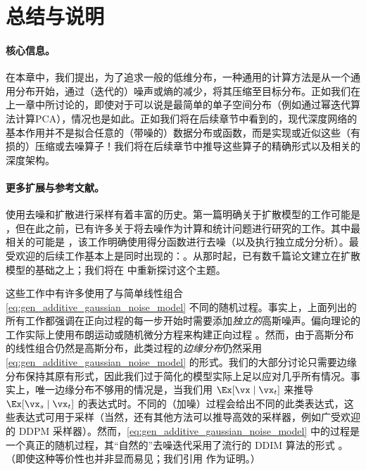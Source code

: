 \documentclass[../../book-main_zh.tex]{subfiles}
\begin{document}

\section{总结与说明}
\paragraph{核心信息。}
在本章中，我们提出，为了追求一般的低维分布，一种通用的计算方法是从一个通用分布开始，通过（迭代的）噪声或熵的减少，将其压缩至目标分布。正如我们在上一章中所讨论的，即使对于可以说是最简单的单子空间分布（例如通过幂迭代算法计算PCA），情况也是如此。正如我们将在后续章节中看到的，现代深度网络的基本作用并不是拟合任意的（带噪的）数据分布或函数，而是实现或近似这些（有损的）压缩或去噪算子！我们将在后续章节中推导这些算子的精确形式以及相关的深度架构。

\paragraph{更多扩展与参考文献。}
使用去噪和扩散进行采样有着丰富的历史。第一篇明确关于扩散模型的工作可能是 \cite{Sohl-Dickstein2015}，但在此之前，已有许多关于将去噪作为计算和统计问题进行研究的工作。其中最相关的可能是 \cite{hyvarinen05a}，该工作明确使用得分函数进行去噪（以及执行独立成分分析）。最受欢迎的后续工作基本上是同时出现的：\cite{ho2020denoising,song2019}。从那时起，已有数千篇论文建立在扩散模型的基础之上；我们将在  中重新探讨这个主题。

这些工作中有许多使用了与简单线性组合 \eqref{eq:gen_additive_gaussian_noise_model} 不同的随机过程。事实上，上面列出的所有工作都强调在正向过程的每一步开始时需要添加\textit{独立的}高斯噪声。偏向理论的工作实际上使用布朗运动或随机微分方程来构建正向过程 \cite{song2020score}。然而，由于高斯分布的线性组合仍然是高斯分布，此类过程的\textit{边缘分布}仍然采用 \eqref{eq:gen_additive_gaussian_noise_model} 的形式。我们的大部分讨论只需要边缘分布保持其原有形式，因此我们过于简化的模型实际上足以应对几乎所有情况。事实上，唯一边缘分布不够用的情况是，当我们用 \(\Ex[\vx \mid \vx_{t}]\) 来推导 \(\Ex[\vx_{s} \mid \vx_{t}]\) 的表达式时。不同的（加噪）过程会给出不同的此类表达式，这些表达式可用于采样（当然，还有其他方法可以推导高效的采样器，例如广受欢迎的 DDPM 采样器）。然而，\eqref{eq:gen_additive_gaussian_noise_model} 中的过程是一个真正的随机过程，其“自然的”去噪迭代采用了流行的 DDIM 算法的形式 \cite{song2020denoising}。（即使这种等价性也并非显而易见；我们引用 \cite{de2025distributional} 作为证明。）
\end{document}
